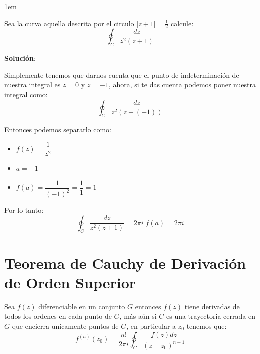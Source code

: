 \documentclass[12pt, fleqn]{report}                             %
\newenvironment{SmallIndentation}[1][0.75em]                    %
    {\begin{adjustwidth}{#1}{}\begin{footnotesize}}                 %
    {\end{footnotesize}\end{adjustwidth}}                           %
\begin{document}
                \begin{SmallIndentation}[1em]

                    Sea la curva aquella descrita por el circulo $|z+1|=\frac{1}{2}$
                    calcule:
                    \begin{equation*}
                        \oint_C \dfrac{dz}{z^2(z+1)}
                    \end{equation*}

                    \textbf{Solución}:

                    Simplemente tenemos que darnos cuenta que el punto de indeterminación de
                    nuestra integral es $z=0$ y $z=-1$, ahora, si te das cuenta podemos poner
                    nuestra integral como:
                    \begin{equation*}
                        \oint_C \dfrac{dz}{z^2(z- (-1))}
                    \end{equation*}

                    Entonces podemos separarlo como:
                    \begin{itemize}
                        \item $f(z) = \dfrac{1}{z^2}$
                        \item $a = -1$
                        \item $f(a) = \dfrac{1}{(-1)^2} = \dfrac{1}{1} = 1$
                    \end{itemize}

                    Por lo tanto:
                    \begin{equation*}
                        \oint_C \dfrac{dz}{z^2(z+1)} = 2 \pi i \; f(a) = 2 \pi i
                    \end{equation*}

                \end{SmallIndentation}





        \clearpage
        \section{Teorema de Cauchy de Derivación de Orden Superior}

            Sea $f(z)$ diferenciable en un conjunto $G$ entonces $f(z)$ tiene derivadas de todos
            los ordenes en cada punto de $G$, más aún si $C$ es una trayectoria cerrada en $G$
            que encierra unicamente puntos de $G$, en particular a $z_0$ tenemos que:
            \begin{equation*}
                f^{(n)}(z_0) = \dfrac{n!}{2 \pi i} \oint_C \dfrac{f(z) dz}{(z-z_0)^{n+1}}
            \end{equation*}
\end{document}
